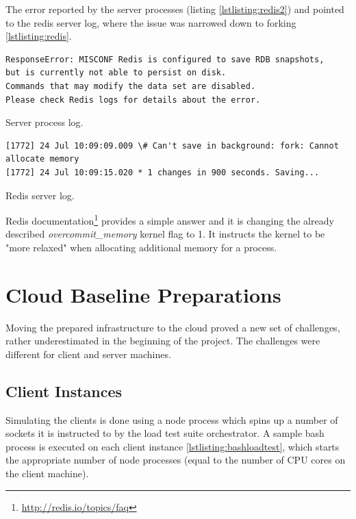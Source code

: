 \documentclass{uvamscse}
\begin{document}
The error reported by the server processes (listing \ref{lstlisting:redis2}) and pointed to the redis server log, where the issue was narrowed down to forking \ref{lstlisting:redis}.

\begin{sourcecode}[h]
\begin{lstlisting}[style=mono]
ResponseError: MISCONF Redis is configured to save RDB snapshots,
but is currently not able to persist on disk.
Commands that may modify the data set are disabled.
Please check Redis logs for details about the error.
\end{lstlisting}
\caption{Server process log.}
\label{lstlisting:redis2}
\end{sourcecode}

\begin{sourcecode}[h]
\begin{lstlisting}[style=mono]
[1772] 24 Jul 10:09:09.009 \# Can't save in background: fork: Cannot allocate memory
[1772] 24 Jul 10:09:15.020 * 1 changes in 900 seconds. Saving...
\end{lstlisting}
\caption{Redis server log.}
\label{lstlisting:redis}
\end{sourcecode}

Redis documentation\footnote{\url{http://redis.io/topics/faq}} provides a simple answer and it is changing the already described \textit{overcommit\_memory} kernel flag to 1. It instructs the kernel to be "more relaxed" when allocating additional memory for a process.

\section{Cloud Baseline Preparations}\label{Cloud baseline preparations}
Moving the prepared infrastructure to the cloud proved a new set of challenges, rather underestimated in the beginning of the project. The challenges were different for client and server machines.

\subsection{Client Instances}
Simulating the clients is done using a node process which spins up a number of sockets it is instructed to by the load test suite orchestrator. A sample bash process is executed on each client instance \ref{lstlisting:bashloadtest}, which starts the appropriate number of node processes (equal to the number of CPU cores on the client machine).
\end{document}
